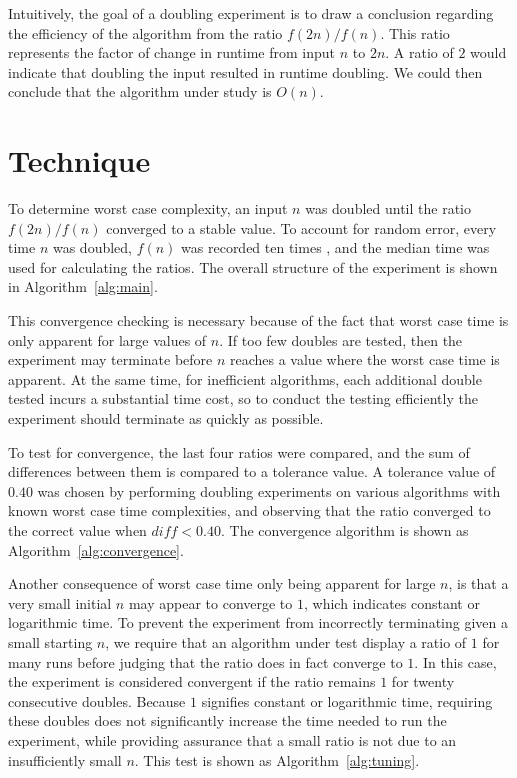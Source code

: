 \documentclass[smallextended]{svjour3}       %
\begin{document}
Intuitively, the goal of a doubling experiment is to draw a conclusion
regarding the efficiency of the algorithm from the ratio
$f(2n)/f(n)$. This ratio represents the factor of change in runtime from
input $n$ to $2n$. A ratio of $2$ would indicate that doubling the
input resulted in runtime doubling. We could then conclude that the
algorithm under study is $O(n)$. 

\section{Technique}
To determine worst case complexity, an input $n$ was doubled until the 
ratio $f(2n) / f(n)$ converged to a stable value. To account for random
error, every time $n$ was doubled, $f(n)$ was recorded ten times
, and the median time was used for calculating the ratios. The overall 
structure of the experiment is shown in Algorithm~\ref{alg:main}.

This convergence checking is necessary because of the fact that worst
case time is only apparent for large values of $n$. If too few doubles
are tested, then the experiment may terminate before $n$ reaches a value
where the worst case time is apparent. At the same time, for inefficient 
algorithms, each additional double tested incurs a substantial time cost, 
so to conduct the testing efficiently the experiment should terminate as 
quickly as possible.

To test for convergence, the last four ratios were compared, and the
sum of differences between them is compared to a tolerance value. A
tolerance value of $0.40$ was chosen 
by performing doubling experiments on various algorithms with known worst case time
complexities, and observing that the ratio converged to the correct
value when $\mathit{diff} < 0.40$. The convergence algorithm is shown
as Algorithm~\ref{alg:convergence}.
  
Another consequence of worst case time only being apparent for large
$n$, is that a very small initial $n$ may appear to converge to $1$,
which indicates constant or logarithmic time. To prevent the
experiment from incorrectly terminating given a small starting $n$, we
require that an algorithm under test display a ratio of $1$ for many
runs before judging that the ratio does in fact converge to $1$. In this case,
the experiment is considered convergent if the ratio remains $1$ for 
twenty consecutive doubles.  Because $1$ signifies constant or logarithmic 
time, requiring these doubles does not significantly increase the time needed
to run the experiment, while providing assurance that a small ratio is not due to
an insufficiently small $n$. This test is shown as Algorithm~\ref{alg:tuning}.
\end{document}
